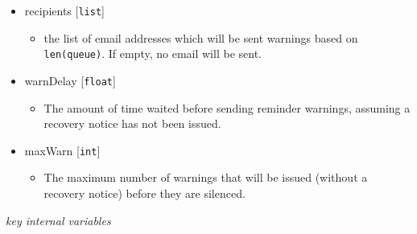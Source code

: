 \documentclass{article}
\newcommand{\pythonint}{\texttt{int}}
\newcommand{\pythonfloat}{\texttt{float}}
\newcommand{\pythonlist}{\texttt{list}}
\begin{document}
\begin{itemize}
{\begin{itemize}
        \end{itemize}
         }
    \item{recipients [\pythonlist]
        \begin{itemize}
            \item{the list of email addresses which will be sent warnings based on \texttt{len(queue)}. If empty, no email will be sent.}
        \end{itemize}
         }
    \item{warnDelay [\pythonfloat]
        \begin{itemize}
            \item{The amount of time waited before sending reminder warnings, assuming a recovery notice has not been issued.}
        \end{itemize}
         }
    \item{maxWarn [\pythonint]
        \begin{itemize}
            \item{The maximum number of warnings that will be issued (without a recovery notice) before they are silenced.}
        \end{itemize}
         }
\end{itemize}

\noindent
\textit{key internal variables}
\end{document}
